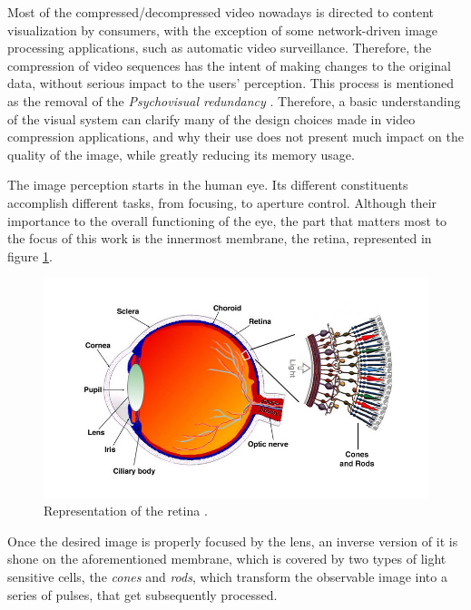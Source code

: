 \nocite{gonzalezDigitalImageProcessing2018}

Most of the compressed/decompressed video nowadays is directed to content visualization by consumers, with the exception of some network-driven image processing applications, such as automatic video surveillance. Therefore, the compression of video sequences has the intent of making changes to the original data, without serious impact to the users' perception. This process is mentioned as the removal of the \emph{Psychovisual redundancy} \cite{shiImageVideoCompression2008}. Therefore, a basic understanding of the visual system can clarify many of the design choices made in video compression applications, and why their use does not present much impact on the quality of the image, while greatly reducing its memory usage.

The image perception starts in the human eye. Its different constituents accomplish different tasks, from focusing, to aperture control. Although their importance to the overall functioning of the eye, the part that matters most to the focus of this work is the innermost membrane, the retina, represented in figure \ref{fig:retina}.

\begin{figure}[h]
    \centering
    \includegraphics[width=\figwidth]{Sections/2AV1/Diagrams/retina.jpeg}
    \caption[Representation of the retina]{Representation of the retina \cite{retinaWebvision}.}
    \label{fig:retina}
\end{figure}

Once the desired image is properly focused by the lens, an inverse version of it is shone on the aforementioned membrane, which is covered by two types of light sensitive cells, the \emph{cones} and \emph{rods}, which transform the observable image into a series of pulses, that get subsequently processed.

